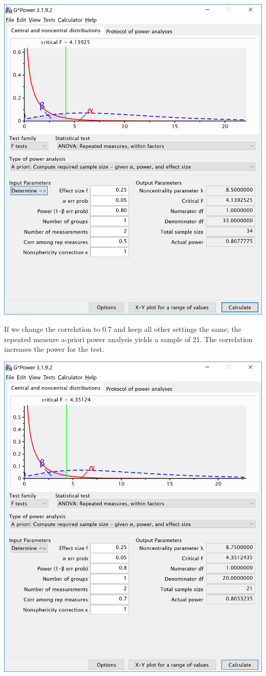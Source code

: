 \documentclass[]{book}
\begin{document}
\includegraphics{screenshots/gpower_1.png}

If we change the correlation to 0.7 and keep all other settings the same, the repeated measure a-priori power analysis yields a sample of 21. The correlation increases the power for the test.

\includegraphics{screenshots/gpower_11.png}
\end{document}
